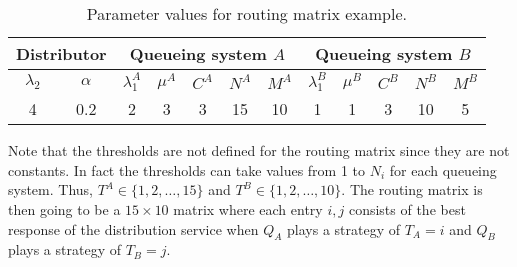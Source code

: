 \begin{table}[H]
    \caption{Parameter values for routing matrix example.}
    \begin{center}
        \small
        \begin{tabular}{||c|c||c|c|c|c|c||c|c|c|c|c||}
            \hline
            \multicolumn{2}{||c||}{\textbf{Distributor}} &
            \multicolumn{5}{c||}{\textbf{Queueing system \(A\)}} &
            \multicolumn{5}{c||}{\textbf{Queueing system \(B\)}} \\
            \hline
            \(\lambda_2\) & \(\alpha\) &
            \(\lambda_1^A\) & \(\mu^A\) & \(C^A\) & \(N^A\) & \(M^A\) &
            \(\lambda_1^B\) & \(\mu^B\) & \(C^B\) & \(N^B\) & \(M^B\) \\
            \hline
            4 & 0.2 & 2 & 3 & 3 & 15 & 10 & 1 & 1 & 3 & 10 & 5 \\
            \hline
        \end{tabular}
    \end{center}
    \label{tab:routing_matrix_example_parameters}
\end{table}

Note that the thresholds are not defined for the routing matrix since they are
not constants.
In fact the thresholds can take values from 1 to \(N_i\) for each queueing
system.
Thus, \(T^A \in \{1, 2, \dots, 15\}\) and \(T^B \in \{1, 2, \dots, 10\}\).
The routing matrix is then going to be a \(15 \times 10\) matrix where each
entry \(i, j\) consists of the best response of the distribution service when
\(Q_A\) plays a strategy of \(T_A=i\) and \(Q_B\) plays a strategy of \(T_B=j\).


